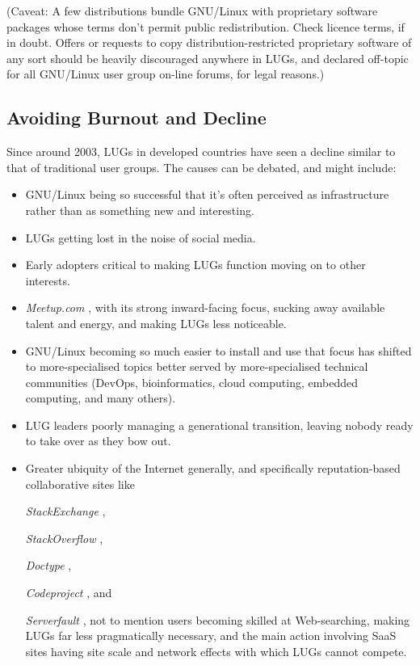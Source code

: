 (Caveat:  A few distributions bundle GNU/Linux with proprietary
software packages whose terms don't permit public redistribution.
Check licence terms, if in doubt.  Offers or requests to copy 
distribution-restricted proprietary software of any sort should be
heavily discouraged anywhere in LUGs, and declared off-topic for all 
GNU/Linux user group on-line forums, for legal reasons.)




\subsection{Avoiding Burnout and Decline}

Since around 2003, LUGs in developed countries have seen a decline
similar to that of traditional user groups.  The causes can be debated,
and might include:

\begin{itemize}
\item GNU/Linux being so successful that it's often perceived as
infrastructure rather than as something new and interesting.
\item LUGs getting lost in the noise of social media.
\item Early adopters critical to making LUGs function moving
on to other interests.
\item 
\emph{Meetup.com} \texttt{\absurl}
, with its strong inward-facing focus, sucking
away available talent and energy, and making LUGs less noticeable.
\item GNU/Linux becoming so much easier to install
and use that focus has shifted to more-specialised topics better served
by more-specialised technical communities (DevOps, bioinformatics,
cloud computing, embedded computing, and many others).
\item LUG leaders poorly managing a generational transition, 
leaving nobody ready to take over as they bow out.
\item Greater ubiquity of the Internet generally, and
specifically reputation-based collaborative sites like 

\emph{StackExchange} \texttt{\abturl}
,

\emph{StackOverflow} \texttt{\abuurl}
, 

\emph{Doctype} \texttt{\abvurl}
, 

\emph{Codeproject} \texttt{\abwurl}
, and 

\emph{Serverfault} \texttt{\abxurl}
, not to mention 
users becoming skilled at Web-searching, making LUGs far less
pragmatically necessary, and the main action involving SaaS sites having 
site scale and network effects with which LUGs cannot compete.
\end{itemize}


